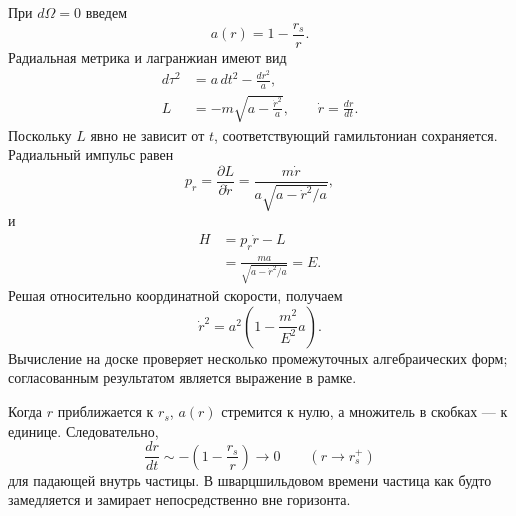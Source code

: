 При \(d\Omega=0\) введем
\begin{equation}
a(r)=1-\frac{r_s}{r}.
\label{eq:l5-a-def}
\end{equation}
Радиальная метрика и лагранжиан имеют вид
\begin{align}
d\tau^2&=a\,dt^2-\frac{dr^2}{a},\\
L&=-m\sqrt{a-\frac{\dot r^2}{a}},
\qquad
\dot r=\frac{dr}{dt}.
\label{eq:l5-radial-lagrangian}
\end{align}
Поскольку \(L\) явно не зависит от \(t\), соответствующий гамильтониан сохраняется.
Радиальный импульс равен
\begin{equation}
p_r=\frac{\partial L}{\partial\dot r}
=\frac{m\dot r}{a\sqrt{a-\dot r^2/a}},
\label{eq:l5-radial-momentum}
\end{equation}
и
\begin{align}
H
&=p_r\dot r-L\\
&=\frac{ma}{\sqrt{a-\dot r^2/a}}
=E.
\label{eq:l5-radial-energy}
\end{align}
Решая относительно координатной скорости, получаем
\begin{equation}
\boxed{
\dot r^2
=a^2\left(1-\frac{m^2}{E^2}a\right).
}
\label{eq:l5-radial-velocity}
\end{equation}
Вычисление на доске проверяет несколько промежуточных алгебраических форм; согласованным результатом является выражение в рамке.

Когда \(r\) приближается к \(r_s\), \(a(r)\) стремится к нулю, а множитель в скобках — к единице. Следовательно,
\begin{equation}
\frac{dr}{dt}
\sim -\left(1-\frac{r_s}{r}\right)
\longrightarrow 0
\qquad(r\longrightarrow r_s^+)
\label{eq:l5-infall-freeze}
\end{equation}
для падающей внутрь частицы. В шварцшильдовом времени частица как будто замедляется и замирает непосредственно вне горизонта.

\begin{classroomqa}
\end{classroomqa}

